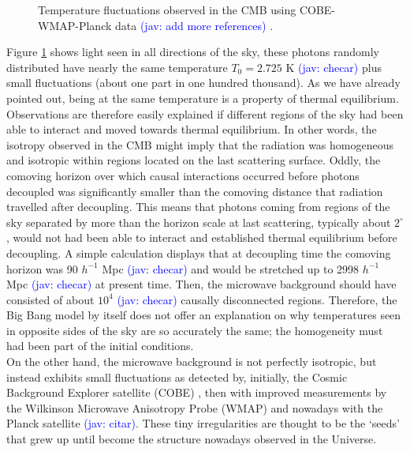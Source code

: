 \documentclass{rmaa}
\newcommand{\jav}[1]{\textcolor{blue}{(jav: #1)}}
\begin{document}
\begin{figure}[ht] 
\centerline{ \epsfxsize=210pt  }
\caption{Temperature fluctuations observed in the CMB using 
 COBE-WMAP-Planck data \jav{add more references} \citep{Gold}. }
\label{fig:wmap5}
\end{figure}

Figure \ref{fig:wmap5} shows light seen in all directions of the sky, 
these photons randomly distributed have nearly the same temperature $T_0= 2.725$ K  \jav{checar}
plus small fluctuations (about one part in one hundred thousand).
 As we have already pointed out, being at the same 
temperature is a property of thermal equilibrium. Observations are therefore easily explained 
if different regions of the sky had been able to interact and moved towards thermal 
equilibrium. In other words, the isotropy observed in the CMB might imply that the radiation was 
homogeneous and isotropic within regions located on the last scattering surface.
Oddly, the comoving horizon over which causal interactions occurred before  
photons decoupled was significantly smaller than the comoving distance 
that radiation travelled after decoupling.
This means that photons coming from regions of the sky separated by more than the
horizon scale at last scattering, typically about $2^\circ$, would not 
had been  able to interact and established thermal equilibrium before decoupling. 
A simple calculation displays that at decoupling time the comoving horizon was
90 $h^{-1}$ Mpc \jav{checar} and would be stretched up to 2998 $h^{-1}$ Mpc \jav{checar} at present time.
Then, the microwave background should have consisted of about $10^4$ \jav{checar} causally 
disconnected regions.  
Therefore, the Big Bang model by itself does not offer an explanation on why
temperatures seen in opposite sides of the sky are so accurately the same; the homogeneity
must had been part of the initial conditions. 
\\

On the other hand, the microwave background is not perfectly isotropic, but instead exhibits
small fluctuations as detected by, initially, the Cosmic Background Explorer satellite (COBE) \citep{Smooth}, 
 then with improved measurements by the Wilkinson Microwave Anisotropy Probe (WMAP)
\citep{wmap5, Larson} and nowadays with the Planck satellite \jav{citar}. 
These tiny irregularities are thought to be the `seeds' that grew 
up until become the structure nowadays observed in the Universe. 
\\
\end{document}
